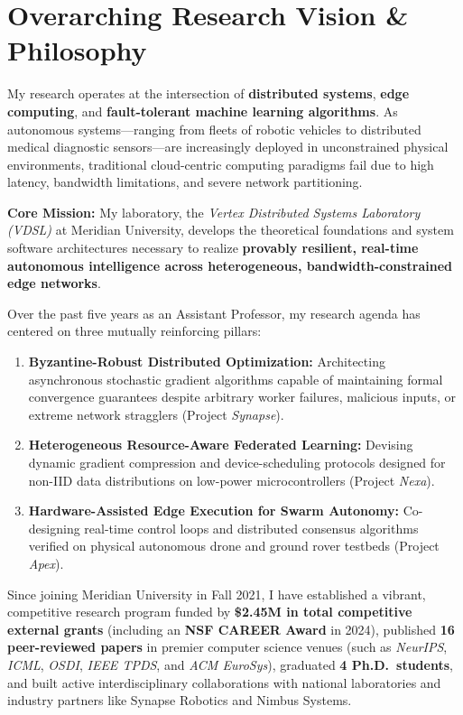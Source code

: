 \documentclass[11pt, a4paper, parskip=half]{scrartcl}
\begin{document}
\section{Overarching Research Vision \& Philosophy}

My research operates at the intersection of \textbf{distributed systems}, \textbf{edge computing}, and \textbf{fault-tolerant machine learning algorithms}. As autonomous systems—ranging from fleets of robotic vehicles to distributed medical diagnostic sensors—are increasingly deployed in unconstrained physical environments, traditional cloud-centric computing paradigms fail due to high latency, bandwidth limitations, and severe network partitioning.

\textbf{Core Mission:} My laboratory, the \textit{Vertex Distributed Systems Laboratory (VDSL)} at Meridian University, develops the theoretical foundations and system software architectures necessary to realize \textbf{provably resilient, real-time autonomous intelligence across heterogeneous, bandwidth-constrained edge networks}.

Over the past five years as an Assistant Professor, my research agenda has centered on three mutually reinforcing pillars:
\begin{enumerate}
  \item \textbf{Byzantine-Robust Distributed Optimization:} Architecting asynchronous stochastic gradient algorithms capable of maintaining formal convergence guarantees despite arbitrary worker failures, malicious inputs, or extreme network stragglers (Project \textit{Synapse}).
  \item \textbf{Heterogeneous Resource-Aware Federated Learning:} Devising dynamic gradient compression and device-scheduling protocols designed for non-IID data distributions on low-power microcontrollers (Project \textit{Nexa}).
  \item \textbf{Hardware-Assisted Edge Execution for Swarm Autonomy:} Co-designing real-time control loops and distributed consensus algorithms verified on physical autonomous drone and ground rover testbeds (Project \textit{Apex}).
\end{enumerate}

Since joining Meridian University in Fall 2021, I have established a vibrant, competitive research program funded by \textbf{\$2.45M in total competitive external grants} (including an \textbf{NSF CAREER Award} in 2024), published \textbf{16 peer-reviewed papers} in premier computer science venues (such as \textit{NeurIPS}, \textit{ICML}, \textit{OSDI}, \textit{IEEE TPDS}, and \textit{ACM EuroSys}), graduated \textbf{4 Ph.D.\ students}, and built active interdisciplinary collaborations with national laboratories and industry partners like Synapse Robotics and Nimbus Systems.
\end{document}
